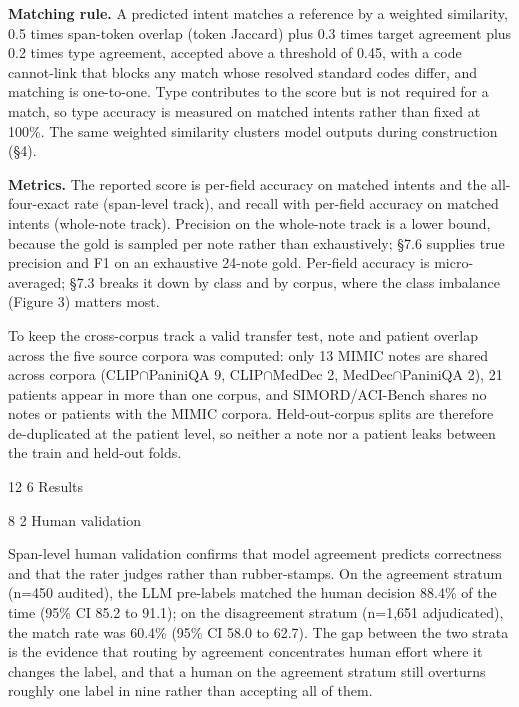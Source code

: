 \documentclass[3p,twocolumn]{elsarticle}
\makeatletter
\renewcommand\section{\@startsection {section}{1}{\z@}%
    {12\p@ \@plus 4\p@ \@minus 4\p@}%
    {6\p@ \@plus 4\p@ \@minus 3\p@}%
    {\normalsize\bfseries\boldmath}}
\renewcommand\subsection{\@startsection{subsection}{2}{\z@}%
    {8\p@ \@plus 4\p@ \@minus 4\p@}%
    {2\p@ \@plus 4\p@ \@minus 3\p@}%
    {\normalfont\normalsize\itshape}}
\makeatother
\begin{document}
\textbf{Matching rule.} A predicted intent matches a reference by a weighted similarity, 0.5 times span-token overlap (token Jaccard) plus 0.3 times target agreement plus 0.2 times type agreement, accepted above a threshold of 0.45, with a code cannot-link that blocks any match whose resolved standard codes differ, and matching is one-to-one. Type contributes to the score but is not required for a match, so type accuracy is measured on matched intents rather than fixed at 100\%. The same weighted similarity clusters model outputs during construction (§4).

\textbf{Metrics.} The reported score is per-field accuracy on matched intents and the all-four-exact rate (span-level track), and recall with per-field accuracy on matched intents (whole-note track). Precision on the whole-note track is a lower bound, because the gold is sampled per note rather than exhaustively; §7.6 supplies true precision and F1 on an exhaustive 24-note gold. Per-field accuracy is micro-averaged; §7.3 breaks it down by class and by corpus, where the class imbalance (Figure 3) matters most.

To keep the cross-corpus track a valid transfer test, note and patient overlap across the five source corpora was computed: only 13 MIMIC notes are shared across corpora (CLIP$\cap$PaniniQA 9, CLIP$\cap$MedDec 2, MedDec$\cap$PaniniQA 2), 21 patients appear in more than one corpus, and SIMORD/ACI-Bench shares no notes or patients with the MIMIC corpora. Held-out-corpus splits are therefore de-duplicated at the patient level, so neither a note nor a patient leaks between the train and held-out folds.

\section{Results}\label{results}

\subsection{Human validation}\label{human-validation}

Span-level human validation confirms that model agreement predicts correctness and that the rater judges rather than rubber-stamps. On the agreement stratum (n=450 audited), the LLM pre-labels matched the human decision 88.4\% of the time (95\% CI 85.2 to 91.1); on the disagreement stratum (n=1,651 adjudicated), the match rate was 60.4\% (95\% CI 58.0 to 62.7). The gap between the two strata is the evidence that routing by agreement concentrates human effort where it changes the label, and that a human on the agreement stratum still overturns roughly one label in nine rather than accepting all of them.
\end{document}

